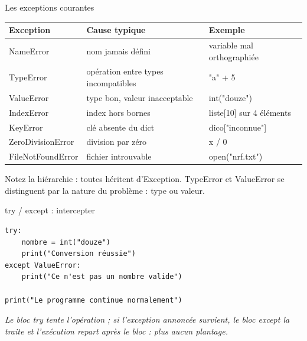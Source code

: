 \documentclass[aspectratio=169,11pt]{beamer}
\begin{document}
\begin{frame}{Les exceptions courantes}
\renewcommand{\arraystretch}{1.3}\small
\begin{center}
\begin{tabular}{lll}
\toprule
\textbf{\color{PyBleu}Exception} & \textbf{\color{PyBleu}Cause typique} & \textbf{\color{PyBleu}Exemple} \\
\midrule
NameError & nom jamais défini & variable mal orthographiée \\
TypeError & opération entre types incompatibles & "a" + 5 \\
ValueError & type bon, valeur inacceptable & int("douze") \\
IndexError & index hors bornes & liste[10] sur 4 éléments \\
KeyError & clé absente du dict & dico["inconnue"] \\
ZeroDivisionError & division par zéro & x / 0 \\
FileNotFoundError & fichier introuvable & open("nrf.txt") \\
\bottomrule
\end{tabular}
\end{center}

\vspace{4pt}

{\small\color{PyGris}Notez la hiérarchie : toutes héritent d'Exception. TypeError et ValueError se distinguent par la nature du problème : type ou valeur.}
\end{frame}

\begin{frame}[fragile]{try / except : intercepter}

\begin{lstlisting}[style=py]
try:
    nombre = int("douze")
    print("Conversion réussie")
except ValueError:
    print("Ce n'est pas un nombre valide")

print("Le programme continue normalement")
\end{lstlisting}
\vspace{0.5pt}

{\small\color{PyGris}\itshape Le bloc try tente l'opération ; si l'exception annoncée survient, le bloc except la traite et l'exécution repart après le bloc : plus aucun plantage.}

\end{frame}
\end{document}

